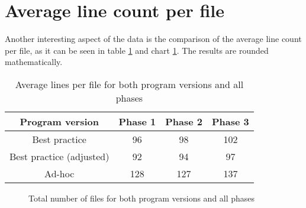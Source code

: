 \section{Average line count per file}
\label{sec:avg-line-count}
Another interesting aspect of the data is the comparison of the average line count per file, as it can be seen in table \ref{table:avg-lines} and chart \ref{fig:avg-lines}. The results are rounded mathematically.

\begin{table}
	\centering
	\label{table:avg-lines}
	\begin{tabular}{|c|c|c|c|} \hline
		\textbf{Program version} &\textbf{Phase 1} & \textbf{Phase 2} & \textbf{Phase 3} \\ \hline
		Best practice & 96 & 98 & 102 \\ \hline
		Best practice (adjusted) & 92 & 94 & 97\\ \hline
		Ad-hoc & 128 & 127 & 137 \\ \hline
	\end{tabular}
	\caption{Average lines per file for both program versions and all phases}
\end{table}

\begin{figure}
	\label{fig:avg-lines}
	\centering
	\caption{Total number of files for both program versions and all phases}
\end{figure}

